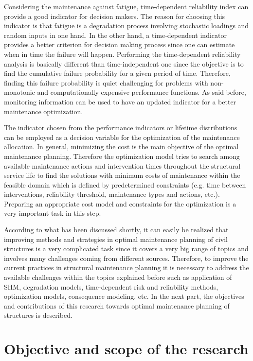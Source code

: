 Considering the maintenance against fatigue, time-dependent reliability index can provide a good indicator for decision makers. The reason for choosing this indicator is that fatigue is a
degradation process involving stochastic loadings and random inputs in one hand. In the other hand, a time-dependent indicator provides a better criterion for decision making process since 
one can estimate when in time the failure will happen. Performing the time-dependent reliability analysis is basically different than time-independent one since the objective is to find the 
cumulative failure probability for a given period of time. Therefore, finding this failure probability is quiet challenging for problems with non-monotonic and computationally expensive 
performance functions. As said before, monitoring information can be used to have an updated indicator for a better maintenance optimization. 


The indicator chosen from the performance indicators or lifetime distributions can be employed as a decision variable for the optimization of the maintenance allocation. In general, 
minimizing the cost is the main objective of the optimal maintenance planning. Therefore the optimization model tries to search among available maintenance actions and intervention 
times throughout the structural service life to find the solutions with minimum costs of maintenance within the feasible domain which is defined by predetermined constraints (e.g. time 
between interventions, reliability threshold, maintenance types and actions, etc.). Preparing an appropriate cost model and constraints for the optimization is a very important task in 
this step. 


According to what has been discussed shortly, it can easily be realized that improving methods and strategies in optimal maintenance planning of civil structures is a very complicated task since it
covers a very big range of topics and involves many challenges coming from different sources. Therefore, to improve the current practices in structural maintenance planning it is 
necessary to address the available challenges within the topics explained before such as application of \ac{SHM}, degradation models, time-dependent risk and reliability methods, optimization
models, consequence modeling, etc. In the next part, the objectives and contributions of this research towards optimal maintenance planning of structures is described. 



\section*{Objective and scope of the research}

